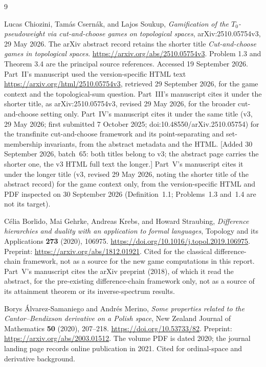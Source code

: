 \documentclass[11pt,letterpaper]{article}
\numberwithin{equation}{section}
\theoremstyle{definition}
\theoremstyle{remark}
\theoremstyle{definition}
\begin{document}
\begin{thebibliography}{9}
\small
\setlength{\itemsep}{0.35em}
\setlength{\parskip}{0pt}

Lucas Chiozini, Tam\'as Csern\'ak, and Lajos Soukup,
\emph{Gamification of the $T_0$-pseudoweight via cut-and-choose games on
topological spaces}, arXiv:2510.05754v3, 29 May 2026.
The arXiv abstract record retains the shorter title
\emph{Cut-and-choose games in topological spaces}.
\url{https://arxiv.org/abs/2510.05754v3}.
Problem 1.3 and Theorem 3.4 are the principal source references.
Accessed 19 September 2026. Part~II's manuscript used the version-specific
HTML text \url{https://arxiv.org/html/2510.05754v3}, retrieved 29 September
2026, for the game context and the topological-sum question. Part~III's
manuscript cites it under the shorter title, as arXiv:2510.05754v3, revised
29 May 2026, for the broader cut-and-choose setting only. Part~IV's
manuscript cites it under the same title (v3, 29 May 2026; first submitted 7
October 2025; doi:10.48550/arXiv.2510.05754) for the transfinite
cut-and-choose framework and its point-separating and set-membership
invariants, from the abstract metadata and the HTML. [Added 30 September
2026, batch~65: both titles belong to v3; the abstract page carries the
shorter one, the v3 HTML full text the longer.]
Part~V's manuscript cites it under the longer title (v3, revised 29 May
2026, noting the shorter title of the abstract record) for the game context
only, from the version-specific HTML and PDF inspected on 30 September 2026
(Definition~1.1; Problems~1.3 and~1.4 are not its target).

C\'elia Borlido, Mai Gehrke, Andreas Krebs, and Howard Straubing,
\emph{Difference hierarchies and duality with an application to formal languages},
Topology and its Applications \textbf{273} (2020), 106975.
\url{https://doi.org/10.1016/j.topol.2019.106975}.
Preprint: \url{https://arxiv.org/abs/1812.01921}.
Cited for the classical difference-chain framework, not as a source for the
new game computations in this report.
Part~V's manuscript cites the arXiv preprint (2018), of which it read the
abstract, for the pre-existing difference-chain framework only, not as a
source of its attainment theorem or its inverse-spectrum results.

Borys \'Alvarez-Samaniego and Andr\'es Merino,
\emph{Some properties related to the Cantor--Bendixson derivative on a Polish space},
New Zealand Journal of Mathematics \textbf{50} (2020), 207--218.
\url{https://doi.org/10.53733/82}.
Preprint: \url{https://arxiv.org/abs/2003.01512}.
The volume PDF is dated 2020; the journal landing page records online
publication in 2021. Cited for ordinal-space and derivative background.


\end{thebibliography}
\end{document}
